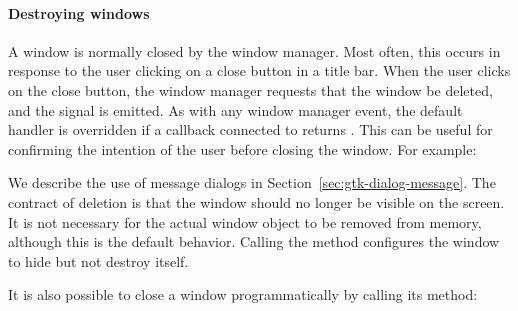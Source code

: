 \paragraph{Destroying windows}
A window is normally closed by the window manager. Most often, this
occurs in response to the user clicking on a close button in a title
bar.  When the user clicks on the
close button, the window manager requests that the window be deleted,
and the  signal is emitted. As with any window
manager event, the default handler is overridden if a callback
connected to  returns .  This can be
useful for confirming the intention of the user before closing the
window. For example:
\begin{Schunk}
\end{Schunk}
%
We describe the use of message dialogs in
Section~\ref{sec:gtk-dialog-message}. The contract of deletion is that
the window should no longer be visible on the screen. It is not
necessary for the actual window object to be removed from memory,
although this is the default behavior. Calling the 
method configures the window to hide but not destroy itself.

It is also possible to close a window programmatically by calling
its  method:
\begin{Schunk}
\end{Schunk}

